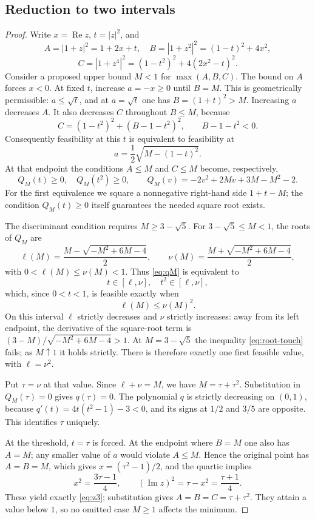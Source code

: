 \documentclass[11pt,a4paper]{article}
\theoremstyle{definition}\newtheorem{definition}[theorem]{Definition}
\theoremstyle{remark}\newtheorem{remark}[theorem]{Remark}
\newcommand{\Rea}{\operatorname{Re}}
\newcommand{\Ima}{\operatorname{Im}}
\begin{document}
\subsection{Reduction to two intervals}
\begin{proof}
Write $x=\Rea z$, $t=|z|^2$, and
\[
A=|1+z|^2=1+2x+t,\quad
B=|1+z^2|^2=(1-t)^2+4x^2,
\]
\[
C=|1+z^4|^2=(1-t^2)^2+4(2x^2-t)^2.
\]
Consider a proposed upper bound $M<1$ for $\max(A,B,C)$. The bound on $A$ forces $x<0$. At fixed $t$, increase $a=-x\ge0$ until $B=M$. This is geometrically permissible: $a\le\sqrt t$, and at $a=\sqrt t$ one has $B=(1+t)^2>M$. Increasing $a$ decreases $A$. It also decreases $C$ throughout $B\le M$, because
\[
C=(1-t^2)^2+(B-1-t^2)^2,\qquad B-1-t^2<0.
\]
Consequently feasibility at this $t$ is equivalent to feasibility at
\[
a=\frac12\sqrt{M-(1-t)^2}.
\]
At that endpoint the conditions $A\le M$ and $C\le M$ become, respectively,
\begin{equation}\label{eq:qM}
Q_M(t)\ge0,\quad Q_M(t^2)\ge0,\qquad
Q_M(v)=-2v^2+2Mv+3M-M^2-2.
\end{equation}
For the first equivalence we square a nonnegative right-hand side $1+t-M$; the condition $Q_M(t)\ge0$ itself guarantees the needed square root exists.

The discriminant condition requires $M\ge3-\sqrt5$. For
$3-\sqrt5\le M<1$, the roots of $Q_M$ are
\[
\ell(M)=\frac{M-\sqrt{-M^2+6M-4}}2,\qquad\nu(M)=\frac{M+\sqrt{-M^2+6M-4}}2,
\]
with $0<\ell(M)\le\nu(M)<1$. Thus \eqref{eq:qM} is equivalent to
\[
t\in[\ell,\nu],\quad t^2\in[\ell,\nu],
\]
which, since $0<t<1$, is feasible exactly when
\begin{equation}\label{eq:root-touch}
\ell(M)\le\nu(M)^2.
\end{equation}
On this interval $\ell$ strictly decreases and $\nu$ strictly increases: away from its left endpoint, the derivative of the square-root term is $(3-M)/\sqrt{-M^2+6M-4}>1$. At $M=3-\sqrt5$ the inequality \eqref{eq:root-touch} fails; as $M\uparrow1$ it holds strictly. There is therefore exactly one first feasible value, with $\ell=\nu^2$.

Put $\tau=\nu$ at that value. Since $\ell+\nu=M$, we have $M=\tau+\tau^2$. Substitution in $Q_M(\tau)=0$ gives $q(\tau)=0$. The polynomial $q$ is strictly decreasing on $(0,1)$, because $q'(t)=4t(t^2-1)-3<0$, and its signs at $1/2$ and $3/5$ are opposite. This identifies $\tau$ uniquely.

At the threshold, $t=\tau$ is forced. At the endpoint where $B=M$ one also has $A=M$; any smaller value of $a$ would violate $A\le M$. Hence the original point has $A=B=M$, which gives $x=(\tau^2-1)/2$, and the quartic implies
\[
x^2=\frac{3\tau-1}{4},\qquad
(\Ima z)^2=\tau-x^2=\frac{\tau+1}{4}.
\]
These yield exactly \eqref{eq:z3}; substitution gives $A=B=C=\tau+\tau^2$. They attain a value below $1$, so no omitted case $M\ge1$ affects the minimum.
\end{proof}
\end{document}
